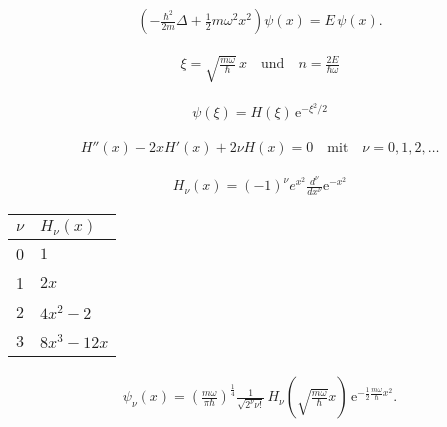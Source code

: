 \documentclass[a4paper,11pt,DIV=12,oneside]{scrreprt}
\begin{document}
\setlength{\tabcolsep}{12.5pt}     
\renewcommand{\arraystretch}{1.25}

\begin{gather}
\left(-\frac{\hbar^2}{2m}\Delta + \frac{1}{2}m\omega^2x^2\right)\psi(x) = E\,\psi(x). 
\end{gather}

\begin{gather}
\xi = \sqrt{\frac{m\omega}{\hbar}}\,x \quad\text{und}\quad n = \frac{2E}{\hbar\omega}
\end{gather}

 \begin{gather}
\psi(\xi) = H(\xi)\,\mathrm e^{-\xi^2/2} 
\end{gather}

  
\begin{gather}
H''(x) - 2x H'(x) + 2\nu H(x) = 0 \quad\text{mit}\quad \nu = 0,1,2,\dots 
\end{gather}


    
\begin{gather}
H_\nu(x)=(-1)^\nu e^{x^2}\frac{d^\nu}{dx^\nu}\mathrm e^{-x^2}
\end{gather}

    
\begin{table}[H]
\centering
{}
\begin{tabular}{cl} \hline
$\nu$ & $H_\nu(x)$ \\ \hline	
0 & $1$ \\
1 & $2x$ \\
2 & $4x^2 - 2$ \\
3 & $8x^3 - 12x$ \\ \hline
\end{tabular}
\label{Tab:Sphärische-Besselfunktionen}
\end{table}

\begin{gather}
\psi_\nu(x)= \left(\frac{m\omega}{\pi\hbar}\right)^\frac{1}{4}\frac{1}{\sqrt{2^\nu\nu!}} \,H_\nu\left(\sqrt{\frac{m\omega}{\hbar}}x\right)\,\mathrm e^{-\frac{1}{2}\frac{m\omega}{\hbar}x^2}.
\end{gather}
\end{document}
